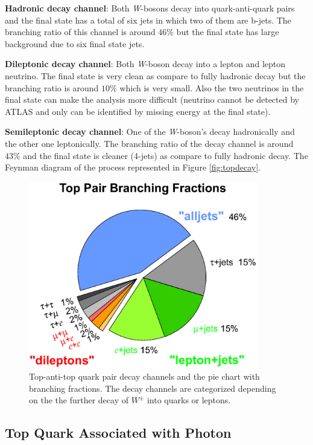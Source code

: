 \textbf{Hadronic decay channel}: Both \textit{W}-bosons decay into quark-anti-quark pairs and the final state has a total of six jets in which two of them are b-jets. The branching ratio of this channel is around $46\%$ but the final state has large background due to six final state jets.

\textbf{Dileptonic decay channel}: Both \textit{W}-boson decay into a lepton and lepton neutrino. The final state is very clean as compare to fully hadronic decay but the branching ratio is around $10\%$ which is very small. Also the two neutrinos in the final state can make the analysis more difficult (neutrino cannot be detected by ATLAS and only can be identified by missing energy at the final state).

\textbf{Semileptonic decay channel}: One of the \textit{W}-boson's decay hadronically and the other one leptonically. The branching ratio of the decay channel is around $43\%$ and the final state is cleaner (4-jets) as compare to fully hadronic decay. The Feynman diagram of the process represented in Figure \ref{fig:topdecay}.

\begin{figure}[H]
\centering
\includegraphics[width=10cm]{Figures/top_pair_branching_frac.eps}
\decoRule
\caption{Top-anti-top quark pair decay channels and the pie chart with branching fractions. The decay channels are categorized depending on the the further decay of $W^{\pm}$ into quarks or leptons\cite{toppair-branching}.}
\label{fig:topdecaychannels}
\end{figure}

\subsection{Top Quark Associated with Photon}
\label{ttgamma}


